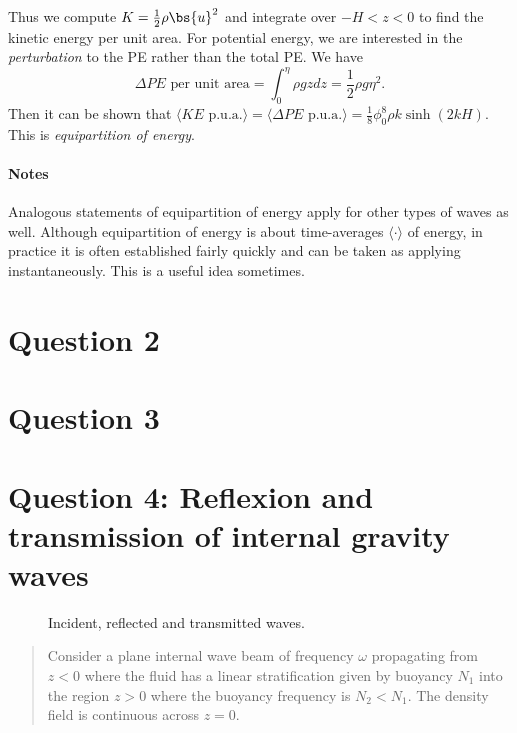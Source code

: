 \documentclass{article}
\begin{document}
Thus we compute $K = \frac{1}{2}\rho\bs{u}^2$ and integrate over $-H<z<0$ to
find the kinetic energy per unit area. For potential energy, we are interested
in the \textit{perturbation} to the PE rather than the total PE. We have
\begin{equation}
    \Delta PE\text{ per unit area} = \int_0^\eta \rho g z dz = \frac{1}{2}\rho g\eta^2.
\end{equation}
Then it can be shown that $\langle KE\text{ p.u.a.}\rangle = \langle\Delta
PE\text{ p.u.a.}\rangle = \frac{1}{8}\phi_0^8\rho k\sinh(2kH)$. This is
\textit{equipartition of energy}.

\paragraph{Notes}
Analogous statements of equipartition of energy apply for other types of waves
as well. Although equipartition of energy is about time-averages
$\langle\cdot\rangle$ of energy, in practice it is often established fairly quickly
and can be taken as applying instantaneously. This is a useful idea sometimes.  


\section{Question 2}
\section{Question 3}
\pagebreak
\section{Question 4: Reflexion and transmission of internal gravity waves}

\begin{figure}
    \begin{center}
        \vspace{4 cm}
        \caption{Incident, reflected and transmitted waves.}
        \label{fig:q4}
    \end{center}
\end{figure}

\begin{quote}
    Consider a plane internal wave beam of frequency $\omega$ propagating from
    $z<0$ where the fluid has a linear stratification given by buoyancy $N_1$
    into the region $z>0$ where the buoyancy frequency is $N_2 < N_1$. The
    density field is continuous across $z=0$.
\end{quote}
\end{document}
